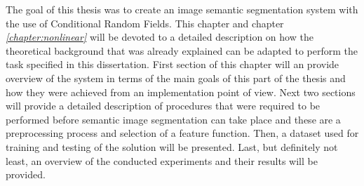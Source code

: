 The goal of this thesis was to create an image semantic segmentation system with the use of Conditional Random Fields. This chapter and chapter \textit{\ref{chapter:nonlinear} } will be devoted to a detailed description on how the theoretical background that was already explained can be adapted to perform the task specified in this dissertation. First section of this chapter will an provide overview of the system in terms of the main goals of this part of the thesis and how they were achieved from an implementation point of view. Next two sections will provide a detailed description of procedures that were required to be performed before semantic image segmentation can take place and these are a preprocessing process and selection of a feature function. Then, a dataset used for training and testing of the solution will be presented. Last, but definitely not least, an overview of the conducted experiments and their results will be provided.